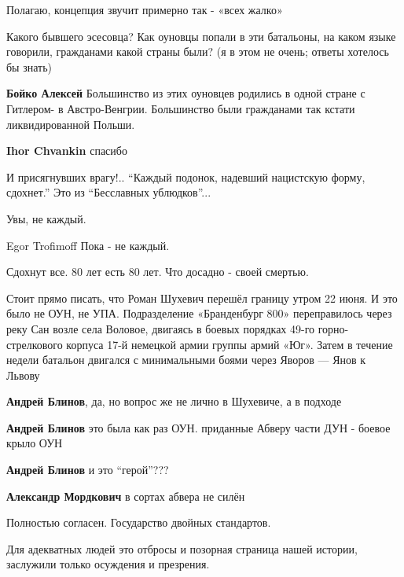 \begin{itemize}
Полагаю, концепция звучит примерно так - «всех жалко»


Какого бывшего эсесовца?  Как оуновцы попали в эти батальоны, на каком языке
говорили, гражданами какой страны были?  (я в этом не очень; ответы хотелось бы
знать)


\textbf{Бойко Алексей}
Большинство из этих оуновцев родились в одной стране с Гитлером- в
Австро-Венгрии. Большинство были гражданами так кстати ликвидированной Польши.

\textbf{Ihor Chvankin} спасибо

И присягнувших врагу!..
\enquote{Каждый подонок, надевший нацистскую форму, сдохнет.} Это из \enquote{Бесславных ублюдков}...

Увы, не каждый.

Egor Trofimoff Пока - не каждый.

Сдохнут все. 80 лет есть 80 лет. Что досадно - своей смертью.


Стоит прямо писать, что Роман Шухевич перешёл границу утром 22 июня. И это было
не ОУН, не УПА. Подразделение «Бранденбург 800» переправилось через реку Сан
возле села Воловое, двигаясь в боевых порядках 49-го горно-стрелкового корпуса
17-й немецкой армии группы армий «Юг». Затем в течение недели батальон двигался
с минимальными боями через Яворов — Янов к Львову

\begin{itemize}
\textbf{Андрей Блинов}, да, но вопрос же не лично в Шухевиче, а в подходе

\textbf{Андрей Блинов} это была как раз ОУН. приданные Абверу части ДУН - боевое крыло ОУН

\textbf{Андрей Блинов} и это \enquote{герой}???

\textbf{Александр Мордкович} в сортах абвера не силён
\end{itemize}

Полностью согласен. Государство двойных стандартов.

Для адекватных людей это отбросы и позорная страница нашей истории, заслужили только осуждения и презрения.


\end{itemize}
